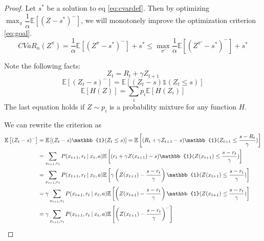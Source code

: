 \begin{proof}

Let $s^*$ be a solution to eq \ref{eq:cvardef}. Then by optimizing $\max_\pi \dfrac{1}{\alpha}\mathbb{E}
\left[ (Z-s^*)^-\right]$, we will monotonely improve the optimization criterion \ref{eq:goal}.
$$
CVaR_\alpha(Z^{\pi}) = \dfrac{1}{\alpha}\mathbb{E}
\left[ (Z^\pi-s^*)^-\right] + s^* \le \max_{\pi'}\dfrac{1}{\alpha}\mathbb{E}
\left[ (Z^{\pi'}-s^*)^-\right] + s^*
$$

Note the following facts:
\begin{equation}
Z_t = R_t + \gamma Z_{t+1}
\end{equation}
\begin{equation}
\mathbb{E}\left[(Z_t-s)^-\right] = \mathbb{E}\left[(Z_t-s)\mathbb{1}(Z_t\le s)\right]
\end{equation}
\begin{equation}
\mathbb{E}[H(Z)] = \sum_i p_i \mathbb{E}[H(Z_i)]
\end{equation}
The last equation holds if $Z\sim p_i$ is a probability mixture for any function $H$.

We can rewrite the criterion as
\begin{equation}
\begin{split}
\mathbb{E}\left[(Z_t-s)^-\right] &= \mathbb{E}\left[(Z_t-s)\mathbb{1}(Z_t\le s)\right] = \mathbb{E}\left[(R_t + \gamma Z_{t+1}-s)\mathbb{1}(Z_{t+1}\le \dfrac{s - R_t}{\gamma})\right]\\
&= \sum_{x_{t+1}, r_t} P(x_{t+1}, r_t \given x_t, a)\mathbb{E}\left[(r_t + \gamma Z(x_{t+1})-s)\mathbb{1}(Z(x_{t+1})\le \dfrac{s - r_t}{\gamma})\right]\\
&= \sum_{x_{t+1}, r_t} P(x_{t+1}, r_t \given x_t, a)\mathbb{E}\left[\gamma\left(Z(x_{t+1})-\dfrac{s-r_t}{\gamma}\right)\mathbb{1}(Z(x_{t+1})\le \dfrac{s - r_t}{\gamma})\right]\\
&= \gamma\sum_{x_{t+1}, r_t} P(x_{t+1}, r_t \given x_t, a)\mathbb{E}\left[\left(Z(x_{t+1})-\dfrac{s-r_t}{\gamma}\right)\mathbb{1}(Z(x_{t+1})\le \dfrac{s - r_t}{\gamma})\right]\\
&= \gamma\sum_{x_{t+1}, r_t} P(x_{t+1}, r_t \given x_t, a)\mathbb{E}\left[\left(Z(x_{t+1}) - \dfrac{s - r_t}{\gamma}\right)^-\right]
\end{split}
\end{equation}



\end{proof}
